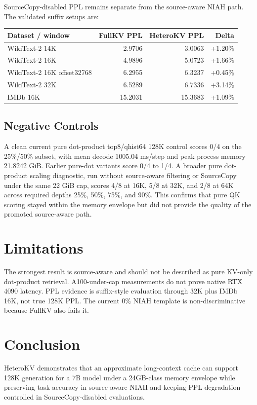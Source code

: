 \documentclass[10pt]{article}
\begin{document}
SourceCopy-disabled PPL remains separate from the source-aware NIAH path. The
validated suffix setups are:

\begin{center}
\begin{tabular}{lrrr}
\toprule
Dataset / window & FullKV PPL & HeteroKV PPL & Delta \\
\midrule
WikiText-2 14K & 2.9706 & 3.0063 & +1.20\% \\
WikiText-2 16K & 4.9896 & 5.0723 & +1.66\% \\
WikiText-2 16K offset32768 & 6.2955 & 6.3237 & +0.45\% \\
WikiText-2 32K & 6.5289 & 6.7336 & +3.14\% \\
IMDb 16K & 15.2031 & 15.3683 & +1.09\% \\
\bottomrule
\end{tabular}
\end{center}

\subsection{Negative Controls}

A clean current pure dot-product top8/qhist64 128K control scores 0/4 on the
25\%/50\% subset, with mean decode 1005.04 ms/step and peak process memory
21.8242 GiB. Earlier pure-dot variants score 0/4 to 1/4. A broader pure
dot-product scaling diagnostic, run without source-aware filtering or
SourceCopy under the same 22 GiB cap, scores 4/8 at 16K, 5/8 at 32K, and
2/8 at 64K across required depths 25\%, 50\%, 75\%, and 90\%. This confirms
that pure QK scoring stayed within the memory envelope but did not provide the
quality of the promoted source-aware path.

\section{Limitations}

The strongest result is source-aware and should not be described as pure KV-only
dot-product retrieval. A100-under-cap measurements do not prove native RTX 4090
latency. PPL evidence is suffix-style evaluation through 32K plus IMDb 16K, not
true 128K PPL. The current 0\% NIAH template is non-discriminative because
FullKV also fails it.

\section{Conclusion}

HeteroKV demonstrates that an approximate long-context cache can support 128K
generation for a 7B model under a 24GB-class memory envelope while preserving
task accuracy in source-aware NIAH and keeping PPL degradation controlled in
SourceCopy-disabled evaluations.
\end{document}
